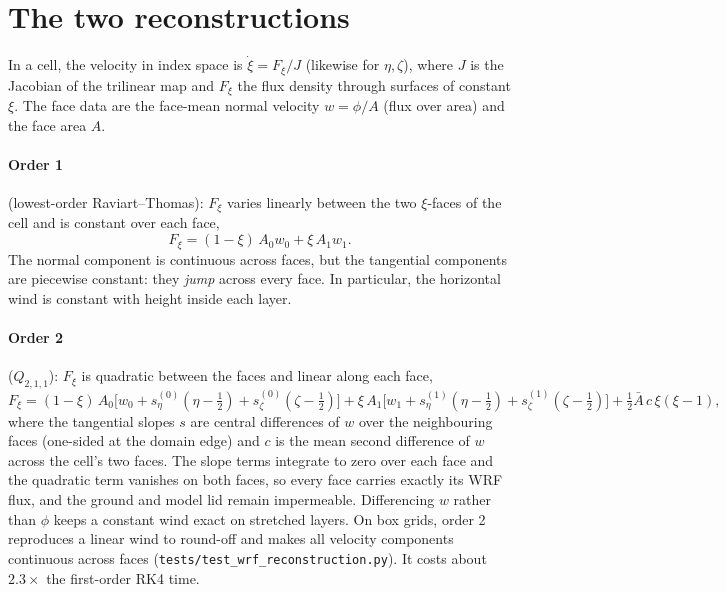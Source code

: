 \documentclass[11pt,a4paper]{article}
\begin{document}
\section{The two reconstructions}

In a cell, the velocity in index space is
$\dot\xi = F_\xi/J$ (likewise for $\eta,\zeta$), where $J$ is the Jacobian of
the trilinear map and $F_\xi$ the flux density through surfaces of constant $\xi$.
The face data are the face-mean normal velocity $w=\phi/A$ (flux over area)
and the face area $A$.

\paragraph{Order 1} (lowest-order Raviart--Thomas): $F_\xi$ varies linearly
between the two $\xi$-faces of the cell and is constant over each face,
\begin{equation}
  F_\xi = (1-\xi)\,A_0w_0 + \xi\,A_1w_1 .
\end{equation}
The normal component is continuous across faces, but the tangential
components are piecewise constant: they \emph{jump} across every face. In
particular, the horizontal wind is constant with height inside each layer.

\paragraph{Order 2} ($Q_{2,1,1}$): $F_\xi$ is quadratic between the faces and
linear along each face,
\begin{equation}
  F_\xi = (1-\xi)\,A_0\bigl[w_0+s^{(0)}_\eta(\eta-\tfrac12)+s^{(0)}_\zeta(\zeta-\tfrac12)\bigr]
        + \xi\,A_1\bigl[w_1+s^{(1)}_\eta(\eta-\tfrac12)+s^{(1)}_\zeta(\zeta-\tfrac12)\bigr]
        + \tfrac12\bar A\,c\,\xi(\xi-1),
\end{equation}
where the tangential slopes $s$ are central differences of $w$ over the
neighbouring faces (one-sided at the domain edge) and $c$ is the mean second
difference of $w$ across the cell's two faces. The slope terms integrate to
zero over each face and the quadratic term vanishes on both faces, so every
face carries exactly its WRF flux, and the ground and model lid remain
impermeable. Differencing $w$ rather than $\phi$ keeps a constant wind exact on
stretched layers. On box grids, order 2 reproduces a linear wind to round-off
and makes all velocity components continuous across faces
(\texttt{tests/test\_wrf\_reconstruction.py}). It costs about $2.3\times$ the
first-order RK4 time.
\end{document}
